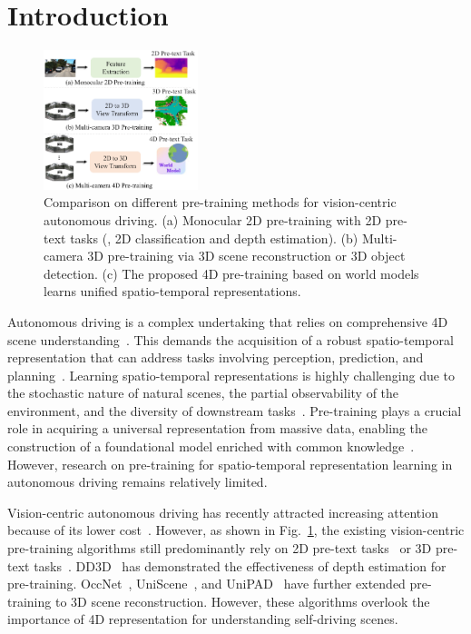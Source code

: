 \section{Introduction}
\label{sec:intro}

\begin{figure}[t]
	\centering
	\includegraphics[width=0.4\textwidth]{figures/compare} 
	\caption{Comparison on different pre-training methods for vision-centric autonomous driving. (a) Monocular 2D pre-training with 2D pre-text tasks (\eg, 2D classification and depth estimation). (b) Multi-camera 3D pre-training via 3D scene reconstruction or 3D object detection. (c) The proposed 4D pre-training based on world models learns unified spatio-temporal representations.}
	\label{fig:compare1}
\end{figure}

Autonomous driving is a complex undertaking that relies on comprehensive 4D scene understanding~\cite{implicit,driveanywhere}. This demands the acquisition of a robust spatio-temporal representation that can address tasks involving perception, prediction, and planning~\cite{uniad}. Learning spatio-temporal representations is highly challenging due to the stochastic nature of natural scenes, the partial observability of the environment, and the diversity of downstream tasks~\cite{wu2023spatiotemporal,nunes2023temporal}. Pre-training plays a crucial role in acquiring a universal representation from massive data, enabling the construction of a foundational model enriched with common knowledge~\cite{bert,rebuffi2017learning,ponderv2,pimae,wang2023mvcontrast}.
However, research on pre-training for spatio-temporal representation learning in autonomous driving remains relatively limited.

Vision-centric autonomous driving has recently attracted increasing attention because of its lower cost~\cite{bevformer,bevdet,uniad,detr3d,petr,bevdepth,beverse}. However, as shown in Fig.~\ref{fig:compare1}, the existing vision-centric pre-training algorithms still predominantly rely on 2D pre-text tasks~\cite{resnet,dd3d} or 3D pre-text tasks~\cite{occnet,uniscene,unipad}. DD3D~\cite{dd3d} has demonstrated the effectiveness of depth estimation for pre-training. OccNet~\cite{occnet}, UniScene~\cite{uniscene}, and UniPAD~\cite{unipad} have further extended pre-training to 3D scene reconstruction. However, these algorithms overlook the importance of 4D representation for understanding self-driving scenes. 

